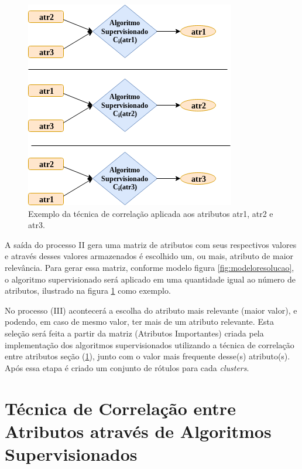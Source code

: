 \begin{figure}[h!]
        \centering
        \includegraphics[scale=0.7]{figs/tecnicamodeloComp.png}
        \caption{Exemplo da técnica de correlação aplicada aos atributos atr1, atr2 e atr3. } \label{fig:tecnicamodelocomp}
\end{figure}


A saída do processo II gera uma matriz de atributos com seus respectivos valores e através desses valores armazenados é escolhido um, ou mais, atributo de maior relevância. Para gerar essa matriz, conforme modelo figura \ref{fig:modeloresolucao}, o algoritmo supervisionado será aplicado em uma quantidade igual ao número de atributos, ilustrado na figura \ref{fig:tecnicamodelocomp} como exemplo.


No processo (III) acontecerá a escolha do atributo mais relevante (maior valor), e podendo, em caso de mesmo valor, ter mais de um atributo relevante. Esta seleção será feita a partir da matriz (Atributos Importantes) criada pela implementação dos algoritmos supervisionados utilizando a técnica de correlação entre atributos seção (\ref{cap:ferramentas:sec:tecnica}), junto com o valor mais frequente desse(s) atributo(s). Após essa etapa é criado um conjunto de rótulos para cada \textit{clusters}. 

\section{Técnica de Correlação entre Atributos através de Algoritmos Supervisionados}\label{cap:ferramentas:sec:tecnica}

